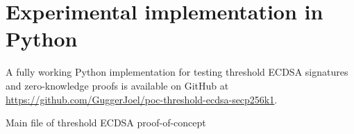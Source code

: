 \chapter{Experimental implementation in Python}
\label{chap:pyImpl}

A fully working Python implementation for testing threshold ECDSA signatures and zero-knowledge proofs
is available on GitHub at \url{https://github.com/GuggerJoel/poc-threshold-ecdsa-secp256k1}.

\begin{longlisting}
	\caption{Main file of threshold ECDSA proof-of-concept}
	\label{lst:secdsaPythonPoc}
\end{longlisting}
